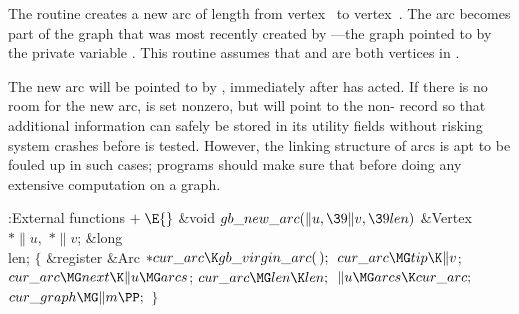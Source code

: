 The routine  creates a new arc of
length 
from vertex~ to vertex~. The arc becomes part of the graph that
was most recently created by ---the graph
pointed to by the private variable . This routine assumes
that  and  are both vertices in .

The new arc will be pointed to by , immediately after
 has acted. If there is no room for the
new arc,
 is set nonzero, but  will point
to the non-\PB{$\NULL$}
record 
so that additional information can safely be stored in its utility fields
without risking system crashes before  is tested.
However, the linking structure of arcs is apt to be fouled up in such
cases; programs should make sure that 
before doing any
extensive computation on a graph.

\Y\B\4:External functions\X${}\mathrel+\E{}$\6
\1\1\&{void} ${}\\{gb\_new\_arc}(\|u,\39\|v,\39\\{len}){}$\6
\&{Vertex} ${}{*}\|u,{}$ ${}{*}\|v{}$;\6
\&{long} \\{len};\2\2\6
${}\{{}$\5
\1\&{register} \&{Arc} ${}{*}\\{cur\_arc}\K\\{gb\_virgin\_arc}(\,);{}$\7
${}\\{cur\_arc}\MG\\{tip}\K\|v{}$;\5
${}\\{cur\_arc}\MG\\{next}\K\|u\MG\\{arcs}{}$;\5
${}\\{cur\_arc}\MG\\{len}\K\\{len};{}$\6
${}\|u\MG\\{arcs}\K\\{cur\_arc};{}$\6
${}\\{cur\_graph}\MG\|m\PP;{}$\6
\4${}\}{}$\2\par
\fi

